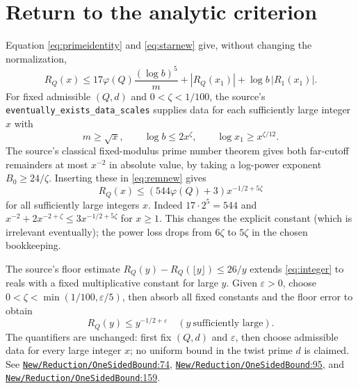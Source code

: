 \documentclass[11pt]{article}
\theoremstyle{remark}\newtheorem{remark}[theorem]{Remark}
\newcommand{\src}[2]{\href{https://github.com/lsernau/grh-lean/blob/72fead102f663d5c7a407964a13dc0cf9d977207/grh/src/#1.lean\#L#2}{\nolinkurl{#1}:#2}}
\begin{document}
\section{Return to the analytic criterion}
Equation \eqref{eq:primeidentity} and \eqref{eq:starnew} give, without changing the normalization,
\begin{equation}\label{eq:remnew}
R_Q(x)\le17\varphi(Q)\frac{(\log b)^5}{m}
 + |R_Q(x_1)|+\log b\,|R_1(x_1)|.
\end{equation}
For fixed admissible $(Q,d)$ and $0<\zeta<1/100$, the source's \texttt{eventually\_exists\_data\_scales} supplies data for each sufficiently large integer $x$ with
\[
m\ge\sqrt{x},\qquad \log b\le2x^\zeta,\qquad \log x_1\ge x^{\zeta/12}.
\]
The source's classical fixed-modulus prime number theorem gives both far-cutoff remainders at most $x^{-2}$ in absolute value, by taking a log-power exponent $B_0\ge24/\zeta$. Inserting these in \eqref{eq:remnew} gives
\begin{equation}\label{eq:integer}
R_Q(x)\le (544\varphi(Q)+3)x^{-1/2+5\zeta}
\end{equation}
for all sufficiently large integers $x$. Indeed $17\cdot2^5=544$ and $x^{-2}+2x^{-2+\zeta}\le3x^{-1/2+5\zeta}$ for $x\ge1$. This changes the explicit constant (which is irrelevant eventually); the power loss drops from $6\zeta$ to $5\zeta$ in the chosen bookkeeping.

The source's floor estimate $R_Q(y)-R_Q(\lfloor y\rfloor)\le26/y$ extends \eqref{eq:integer} to reals with a fixed multiplicative constant for large $y$. Given $\varepsilon>0$, choose $0<\zeta<\min(1/100,\varepsilon/5)$, then absorb all fixed constants and the floor error to obtain
\[
R_Q(y)\le y^{-1/2+\varepsilon}\quad (y\ \text{sufficiently large}).
\]
The quantifiers are unchanged: first fix $(Q,d)$ and $\varepsilon$, then choose admissible data for every large integer $x$; no uniform bound in the twist prime $d$ is claimed. See \src{New/Reduction/OneSidedBound}{74}, \src{New/Reduction/OneSidedBound}{95}, and \src{New/Reduction/OneSidedBound}{159}.
\end{document}
